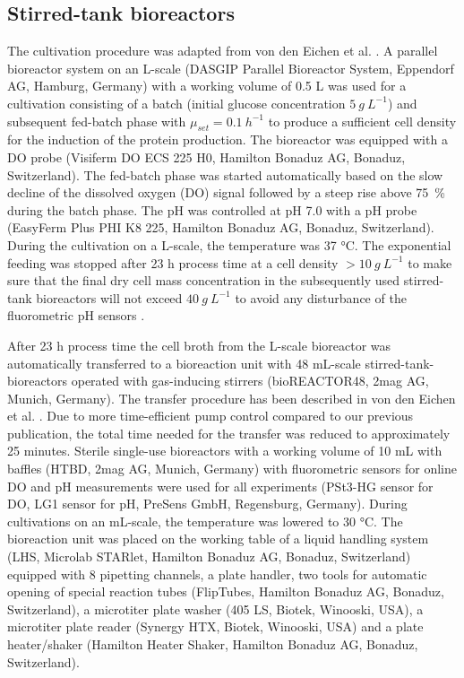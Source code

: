 \documentclass[sn-standardnature]{sn-jnl}%
\theoremstyle{thmstyleone}%
\theoremstyle{thmstyletwo}%
\theoremstyle{thmstylethree}%
\begin{document}
\subsection{Stirred-tank bioreactors}
The cultivation procedure was adapted from von den Eichen et al. \cite{von2021automated}.
A parallel bioreactor system on an L-scale (DASGIP Parallel Bioreactor System, Eppendorf AG, Hamburg, Germany) with a working volume of 0.5 L was used for a cultivation consisting of a batch (initial glucose concentration $5\ g\ L^{-1}$) and subsequent fed-batch phase with $\mu_{set} = 0.1\ h^{-1}$ to produce a sufficient cell density for the induction of the protein production.
The bioreactor was equipped with a DO probe (Visiferm DO ECS 225 H0, Hamilton Bonaduz AG, Bonaduz, Switzerland).
The fed-batch phase was started automatically based on the slow decline of the dissolved oxygen (DO) signal followed by a steep rise above 75~\% during the batch phase.
The pH was controlled at pH 7.0 with a pH probe (EasyFerm Plus PHI K8 225, Hamilton Bonaduz AG, Bonaduz, Switzerland).
During the cultivation on a L-scale, the temperature was 37 °C.
The exponential feeding was stopped after 23 h process time at a cell density $> 10\ g\ L^{-1}$ to make sure that the final dry cell mass concentration in the subsequently used stirred-tank bioreactors will not exceed $40\ g\ L^{-1}$ to avoid any disturbance of the fluorometric pH sensors \cite{faust2014feeding}.

After 23 h process time the cell broth from the L-scale bioreactor was automatically transferred to a bioreaction unit with 48 mL-scale stirred-tank-bioreactors operated with gas-inducing stirrers (bioREACTOR48, 2mag AG, Munich, Germany).
The transfer procedure has been described in von den Eichen et al. \cite{von2021automated}.
Due to more time-efficient pump control compared to our previous publication, the total time needed for the transfer was reduced to approximately 25 minutes.
Sterile single-use bioreactors with a working volume of 10 mL with baffles (HTBD, 2mag AG, Munich, Germany) with fluorometric sensors for online DO and pH measurements were used for all experiments (PSt3-HG sensor for DO, LG1 sensor for pH,  PreSens GmbH, Regensburg, Germany).
During cultivations on an mL-scale, the temperature was lowered to 30 °C.
The bioreaction unit was placed on the working table of a liquid handling system (LHS, Microlab STARlet, Hamilton Bonaduz AG, Bonaduz, Switzerland) equipped with 8 pipetting channels, a plate handler, two tools for automatic opening of special reaction tubes (FlipTubes, Hamilton Bonaduz AG, Bonaduz, Switzerland), a microtiter plate washer (405 LS, Biotek, Winooski, USA), a microtiter plate reader (Synergy HTX, Biotek, Winooski, USA) and a plate heater/shaker (Hamilton Heater Shaker, Hamilton Bonaduz AG, Bonaduz, Switzerland).
\end{document}
